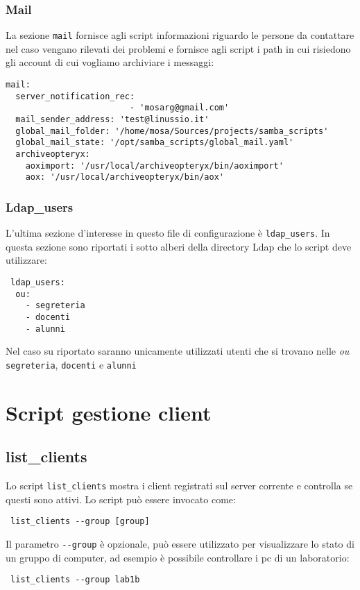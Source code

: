 \documentclass[a4paper,10pt,oneside]{memoir}
\begin{document}
\subsection{Mail}

La sezione \verb#mail# fornisce agli script informazioni riguardo le persone da contattare nel caso vengano rilevati dei problemi e fornisce agli script i path in cui risiedono gli account di cui vogliamo archiviare i messaggi:
\begin{verbatim}
mail:
  server_notification_rec:
                         - 'mosarg@gmail.com'
  mail_sender_address: 'test@linussio.it'
  global_mail_folder: '/home/mosa/Sources/projects/samba_scripts'
  global_mail_state: '/opt/samba_scripts/global_mail.yaml'
  archiveopteryx:
    aoximport: '/usr/local/archiveopteryx/bin/aoximport'
    aox: '/usr/local/archiveopteryx/bin/aox'
\end{verbatim}

\subsection{Ldap\_users}
L'ultima sezione d'interesse in questo file di configurazione è \verb#ldap_users#. In questa sezione sono riportati i sotto alberi della directory Ldap che lo script deve utilizzare:
\begin{verbatim}
 ldap_users:
  ou:
    - segreteria
    - docenti
    - alunni
\end{verbatim}
Nel caso su riportato saranno unicamente utilizzati utenti che si trovano nelle \textsl{ou} \verb#segreteria#, \verb#docenti# e \verb#alunni#



 \chapter{Script gestione client}




\section*{list\_clients}
  Lo script \verb#list_clients# mostra i client registrati sul server corrente e controlla se questi sono attivi. Lo script può essere invocato come:
\begin{verbatim}
 list_clients --group [group]
\end{verbatim}
Il parametro \verb#--group# è opzionale, può essere utilizzato per visualizzare lo stato di un gruppo di computer, ad esempio è possibile controllare i pc di un laboratorio:
\begin{verbatim}
 list_clients --group lab1b
\end{verbatim}
\end{document}
